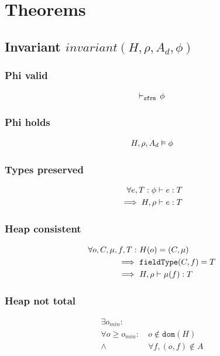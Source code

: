 \documentclass[11pt,a4paper]{article}
\begin{document}
\section{Theorems}
\subsection{Invariant $invariant(H, \rho, A_d, \phi)$}

\subsubsection{Phi valid}
\begin{align*}
    \vdash_\texttt{sfrm}\, {\phi}
\end{align*}

\subsubsection{Phi holds}
\begin{align*}
    H,\rho,A_d \vDash \phi
\end{align*}

\subsubsection{Types preserved}
\begin{align*}
    \forall e, T : \phi \vdash e : T& \\
    \implies H, \rho \vdash e : T&
\end{align*}

\subsubsection{Heap consistent}
\begin{align*}
\forall o, C, \mu, f, T :&~ 
H(o) = (C, \mu) \\
\implies&~ 
\texttt{fieldType}(C,f) = T \\
\implies&~
H, \rho \vdash \mu(f) : T
\end{align*}

\subsubsection{Heap not total}
\begin{align*}
\exists o_{min} :&\\
\forall o \ge o_{min} :&~ o \not \in \texttt{dom}(H) \\
\wedge&~ \forall f, (o, f) \not \in A
\end{align*}
\end{document}
